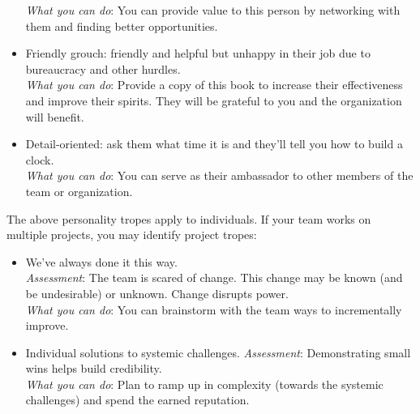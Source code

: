 \begin{itemize}
    \textit{What you can do}: You can provide value to this person by networking with them and finding better opportunities.
    \item Friendly grouch: friendly and helpful but unhappy in their job due to bureaucracy and other hurdles. \\
    \textit{What you can do}: Provide a copy of this book to increase their effectiveness and improve their spirits. They will be grateful to you and the organization will benefit.
    \item Detail-oriented: ask them what time it is and they'll tell you how to build a clock. \\
    \textit{What you can do}: You can serve as their ambassador to other members of the team or organization.  
\end{itemize}


The above personality tropes apply to individuals. If your team works on multiple projects, you may identify project tropes:
\begin{itemize}
    \item We've always done it this way.\\
    \textit{Assessment}: The team is scared of change. This change may be known (and be undesirable) or unknown. Change disrupts power.\\
    \textit{What you can do}: You can brainstorm with the team ways to incrementally improve. 
    \item Individual solutions to systemic challenges.
    \textit{Assessment}: Demonstrating small wins helps build credibility. \\
    \textit{What you can do}: Plan to ramp up in complexity (towards the systemic challenges) and spend the earned reputation.
\end{itemize}
